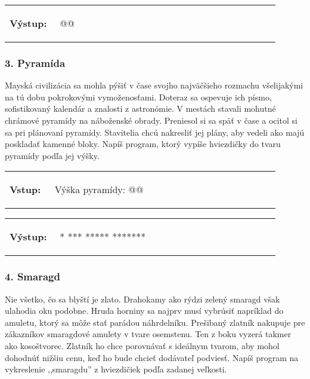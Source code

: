 \vspace{-2em}
\begin{tabular}{@{}p{0.15\linewidth}p{0.75\linewidth}}
\textbf{\small Výstup:} &
\vspace{-3em}
\begin{code}
@\fbox{\textit{*****}}@
\end{code}
\end{tabular}
\vspace{-2em}


\subsubsection*{3. Pyramída}
Mayská civilizácia sa mohla pýšiť v čase svojho najväčšieho rozmachu všelijakými na tú dobu pokrokovými vymoženosťami. Doteraz sa ospevuje ich písmo, sofistikovaný kalendár a znalosti z astronómie. V mestách stavali mohutné chrámové pyramídy na náboženské obrady. Preniesol si sa späť v čase a ocitol si sa pri plánovaní pyramídy. Stavitelia chcú nakresliť jej plány, aby vedeli ako majú poskladať kamenné bloky. Napíš program, ktorý vypíše hviezdičky do tvaru pyramídy podľa jej výšky.

\begin{tabular}{@{}p{0.15\linewidth}p{0.75\linewidth}}
\textbf{\small Vstup:} &
\vspace{-3em}
\begin{code}
Výška pyramídy: @\fbox{4}@
\end{code}
\end{tabular}

\vspace{-2em}
\begin{tabular}{@{}p{0.15\linewidth}p{0.75\linewidth}}
\textbf{\small Výstup:} &
\vspace{-3em}
\begin{code}
   *
  ***
 *****
*******
\end{code}
\end{tabular}
\vspace{-2em}


\subsubsection*{4. Smaragd}
Nie všetko, čo sa blyští je zlato. Drahokamy ako rýdzi zelený smaragd však ulahodia oku podobne. Hruda horniny sa najprv musí vybrúsiť napríklad do amuletu, ktorý sa môže stať parádou náhrdelníku. Prešibaný zlatník nakupuje pre zákazníkov smaragdové amulety v tvare osemstenu. Ten z boku vyzerá takmer ako kosoštvorec. Zlatník ho chce porovnávať s ideálnym tvarom, aby mohol dohodnúť nižšiu cenu, keď ho bude chcieť dodávateľ podviesť. Napíš program na vykreslenie ,,smaragdu'' z hviezdičiek podľa zadanej veľkosti.

